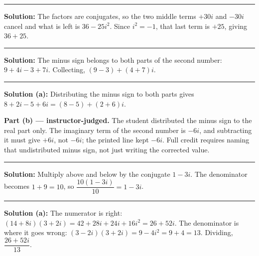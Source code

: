 \documentclass[12pt]{article}
\begin{document}



\vspace{0.3cm}
\noindent\rule{\linewidth}{0.4pt}
\vspace{0.2cm}


\textbf{Solution:} The factors are conjugates, so the two middle terms
$+30i$ and $-30i$ cancel and what is left is $36 - 25i^{2}$. Since
$i^{2} = -1$, that last term is $+25$, giving $36 + 25$. 

\vspace{0.15cm}
\noindent\rule{\linewidth}{0.2pt}


\textbf{Solution:} The minus sign belongs to both parts of the second number:
$9 + 4i - 3 + 7i$. Collecting, $(9 - 3) + (4 + 7)i$. 

\vspace{0.15cm}
\noindent\rule{\linewidth}{0.2pt}


\textbf{Solution (a):} Distributing the minus sign to both parts gives
$8 + 2i - 5 + 6i = (8 - 5) + (2 + 6)i$. 

\textbf{Part (b) --- instructor-judged.} The student distributed the minus sign
to the real part only. The imaginary term of the second number is $-6i$, and
subtracting it must give $+6i$, not $-6i$; the printed line kept $-6i$. Full
credit requires naming that undistributed minus sign, not just writing the
corrected value.

\vspace{0.15cm}
\noindent\rule{\linewidth}{0.2pt}


\textbf{Solution:} Multiply above and below by the conjugate $1 - 3i$. The
denominator becomes $1 + 9 = 10$, so
$\dfrac{10(1 - 3i)}{10} = 1 - 3i$. 

\vspace{0.15cm}
\noindent\rule{\linewidth}{0.2pt}


\textbf{Solution (a):} The numerator is right:
$(14 + 8i)(3 + 2i) = 42 + 28i + 24i + 16i^{2} = 26 + 52i$. The denominator is
where it goes wrong: $(3 - 2i)(3 + 2i) = 9 - 4i^{2} = 9 + 4 = 13$.
Dividing, $\dfrac{26 + 52i}{13}$. 
\end{document}
